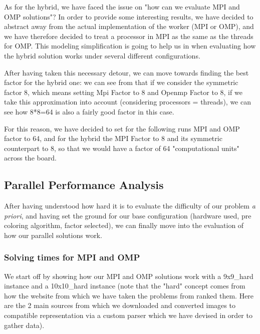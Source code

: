 As for the hybrid, we have faced the issue on "how can we evaluate MPI and OMP solutions"? In order to provide some interesting results, we have decided to abstract away from the actual implementation of the worker (MPI or OMP), and we have therefore decided to treat a processor in MPI as the same as the threads for OMP. This modeling simplification is going to help us in  when evaluating how the hybrid solution works under several different configurations.

After having taken this necessary detour, we can move towards finding the best factor for the hybrid one: we can see from  that if we consider the symmetric factor 8, which means setting Mpi Factor to 8 and Openmp Factor to 8, if we take this approximation into account (considering processors = threads), we can see how 8*8=64 is also a fairly good factor in this case.


For this reason, we have decided to set for the following runs MPI and OMP factor to 64, and for the hybrid the MPI Factor to 8 and its symmetric counterpart to 8, so that we would have a factor of 64 "computational units" across the board.


\subsection{Parallel Performance Analysis}

After having understood how hard it is to evaluate the difficulty of our problem \textit{a priori}, and having set the ground for our base configuration (hardware used, pre coloring algorithm, factor selected), we can finally move into the evaluation of how our parallel solutions work.

\subsubsection{Solving times for MPI and OMP}
\label{subsubsec:solving_times_mpi_omp}

We start off by showing how our MPI and OMP solutions work with a 9x9\_hard instance and a 10x10\_hard instance (note that the "hard" concept comes from how the website from which we have taken the problems from ranked them. Here are the 2 main sources from which we downloaded \cite{puzzle_futoshiki,puddelbee} and converted images to compatible representation via a custom parser which we have devised in order to gather data).

